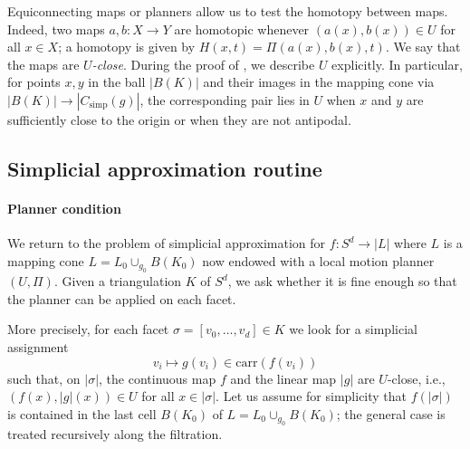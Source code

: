 \documentclass[a4paper,english,cleveref,autoref,thm-restate,nolineno]{socg-lipics-v2021}
\newcommand{\geomreal}[1] { |#1| } %
\newcommand{\carr}[1] { \mathrm{carr}(#1) } %
\newcommand{\conesimp}[1] { C_\mathrm{simp}(#1) } %
\newif\iffullversion
\newcommand{\fullonly}[1]{\iffullversion #1\fi}
\begin{document}
\begin{note}
	\label{note:lec_data_gluing}
	Equiconnecting maps or planners allow us to test the homotopy between maps.
	Indeed, two maps $a,b\colon X\to Y$ are homotopic whenever $(a(x),b(x))\in U$ for all $x\in X$; a homotopy is given by $H(x,t) = \Pi(a(x),b(x),t)$.
	We say that the maps are \textit{$U$-close}.
	During the proof of , we describe $U$ explicitly.
	In particular, for points $x,y$ in the ball $\geomreal{B(K)}$ and their images in the mapping cone via $\geomreal{B(K)}\to\geomreal{\conesimp{g}}$, the corresponding pair lies in $U$ when $x$ and $y$ are sufficiently close to the origin or when they are not antipodal.
	
	\fullonly{
		We recall that, in the proof of the simplicial approximation theorem \cite[Theorem~2C.1]{hatcher_algebraic_2002}, a map $a$ and a simplicial approximation $b$ are shown to be homotopic via the straight-line homotopy
		$H(x,t) = (1-t)a(x) + t\,\geomreal{b}(x)$.
		This is precisely the homotopy induced by the \textit{linear} motion planner $\Pi(x,y,t)=(1-t)x+ty$.
		The caveat is that $\Pi$ applies only for pairs of points that lie in a common simplex. 
		By contrast, the planner of \Cref{th:lec_data_gluing} also connects points in simplices that are far apart, allowing fewer subdivisions and thus smaller complexes.
	}
\end{note}

\subsection{Simplicial approximation routine}
\label{subsec:approximation_routine}

\paragraph*{Planner condition}

We return to the problem of simplicial approximation for $f \colon S^d \to \geomreal{L}$ where $L$ is a mapping cone $L = L_0 \cup_{g_0} B(K_0)$ now endowed with a local motion planner $(U,\Pi)$. 
Given a triangulation $K$ of $S^d$, we ask whether it is fine enough so that the planner can be applied on each facet.

More precisely, for each facet $\sigma = [v_0,\dots,v_d] \in K$ we look for a simplicial assignment
\[
v_i \mapsto g(v_i) \in \carr{f(v_i)}
\]
such that, on $\geomreal{\sigma}$, the continuous map $f$ and the linear map $\geomreal{g}$ are $U$-close, i.e., $(f(x), \geomreal{g}(x)) \in U$ for all $x \in \geomreal{\sigma}$. 
Let us assume for simplicity that $f(\geomreal{\sigma})$ is contained in the last cell $B(K_0)$ of $L = L_0 \cup_{g_0} B(K_0)$; the general case is treated recursively along the filtration.
\end{document}
